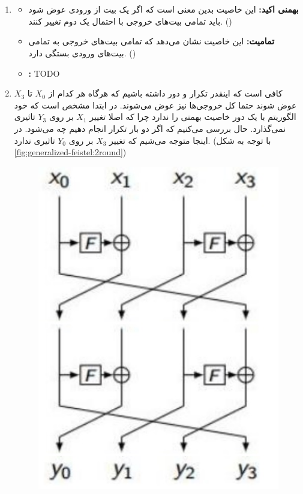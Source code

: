 \documentclass[]{article}
\begin{document}
\section{}
\begin{enumerate}
    \item \begin{itemize}
        \item \textbf{بهمنی اکید:} این خاصیت بدین معنی است که اگر یک بیت از ورودی عوض شود باید تمامی بیت‌های خروجی با احتمال یک دوم تغییر کنند. ()
        \item \textbf{تمامیت:} این خاصیت نشان می‌دهد که تمامی بیت‌های خروجی به تمامی بیت‌های ورودی بستگی دارد. ()
        \item \textbf{:} TODO
    \end{itemize}
    \item کافی است که اینقدر تکرار و دور داشته باشیم که هرگاه هر کدام از
    $X_0$ تا $X_3$
    عوض شوند حتما کل خروجی‌ها نیز عوض می‌شوند. در ابتدا مشخص است که خود الگوریتم با یک دور خاصیت بهمنی
    را ندارد چرا که اصلا تغییر
    $X_1$
    بر روی
    $Y_3$
    تاثیری نمی‌گذارد. حال بررسی می‌کنیم که اگر دو بار تکرار انجام دهیم چه می‌شود. در اینجا متوجه می‌شیم که تغییر
    $X_3$
    بر روی
    $Y_0$
    تاثیری ندارد. (با توجه به شکل \ref{fig:generalized-feistel:2round})
    \begin{figure}
        \centering
        \includegraphics[scale=0.5]{pics/3-2-rounds.jpg}

\end{figure}
\end{enumerate}
\end{document}
